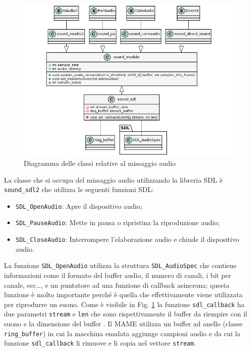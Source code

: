 \begin{figure}[H]
	\includegraphics[width=\linewidth]{immagini/class_mixingSDLFull}
	\caption{Diagramma delle classi relative al missaggio audio}
	\label{fig:class_mixingSDLFull}
\end{figure}


La classe che si occupa del missaggio audio utilizzando la libreria SDL è \verb|sound_sdl2| che utilizza le seguenti funzioni SDL:

\begin{itemize}	
	\item \verb|SDL_OpenAudio|: Apre il dispositivo audio;
	\item \verb|SDL_PauseAudio|: Mette in pausa o ripristina la riproduzione audio;
	\item \verb|SDL_CloseAudio|: Interrompere l'elaborazione audio e chiude il dispositivo audio.
\end{itemize}

La funzione \verb|SDL_OpenAudio| utilizza la struttura \verb|SDL_AudioSpec| che contiene informazioni come il formato del buffer audio, il numero di canali, i bit per canale, ecc\dots, e un puntatore ad una funzione di callback asincrona; questa funzione è molto importante perché è quella che effettivamente viene utilizzata per riprodurre un suono. Come è visibile in Fig. \ref{fig:class_mixingSDLFull} la funzione \verb|sdl_callback| ha due parametri \verb|stream| e \verb|len| che sono rispettivamente il buffer da riempire con il suono e la dimensione del buffer \parencite{FocusOnSDL}. Il MAME utilizza un buffer ad anello (classe \verb|ring_buffer|) in cui la macchina emulata aggiunge campioni audio e da cui la funzione \verb|sdl_callback| li rimuove e li copia nel vettore \verb|stream|.


